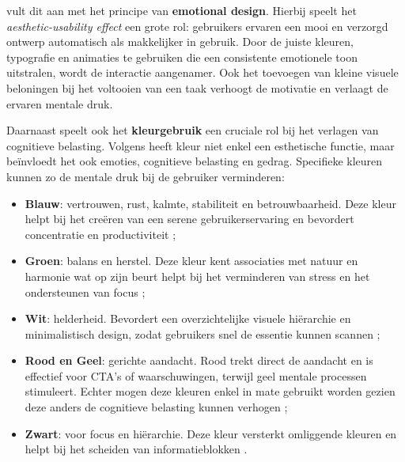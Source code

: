 \vspace{1em}

\textcite{anoda2024ux} vult dit aan met het principe van \textbf{emotional design}. Hierbij speelt het \textit{aesthetic-usability effect} een grote rol: gebruikers ervaren een mooi en verzorgd ontwerp automatisch als makkelijker in gebruik. Door de juiste kleuren, typografie en animaties te gebruiken die een consistente emotionele toon uitstralen, wordt de interactie aangenamer. Ook het toevoegen van kleine visuele beloningen bij het voltooien van een taak verhoogt de motivatie en verlaagt de ervaren mentale druk.

\vspace{1em}

Daarnaast speelt ook het \textbf{kleurgebruik} een cruciale rol bij het verlagen van cognitieve belasting. Volgens \textcite{MELIKSETYAN2025} heeft kleur niet enkel een esthetische functie, maar beïnvloedt het ook emoties, cognitieve belasting en gedrag. Specifieke kleuren kunnen zo de mentale druk bij de gebruiker verminderen:

\begin{itemize}
    \item \textbf{Blauw}: vertrouwen, rust, kalmte, stabiliteit en betrouwbaarheid. Deze kleur helpt bij het creëren van een serene gebruikerservaring en bevordert concentratie en productiviteit \autocite{MELIKSETYAN2025};
    \item \textbf{Groen}: balans en herstel. Deze kleur kent associaties met natuur en harmonie wat op zijn beurt helpt bij het verminderen van stress en het ondersteunen van focus \autocite{MELIKSETYAN2025};
    \item \textbf{Wit}: helderheid. Bevordert een overzichtelijke visuele hiërarchie en minimalistisch design, zodat gebruikers snel de essentie kunnen scannen \autocite{MELIKSETYAN2025};
    \item \textbf{Rood en Geel}: gerichte aandacht. Rood trekt direct de aandacht en is effectief voor CTA's of waarschuwingen, terwijl geel mentale processen stimuleert. Echter mogen deze kleuren enkel in mate gebruikt worden gezien deze anders de cognitieve belasting kunnen verhogen \autocite{MELIKSETYAN2025};
    \item \textbf{Zwart}: voor focus en hiërarchie. Deze kleur versterkt omliggende kleuren en helpt bij het scheiden van informatieblokken \autocite{MELIKSETYAN2025}.
\end{itemize}

\vspace{1em}


